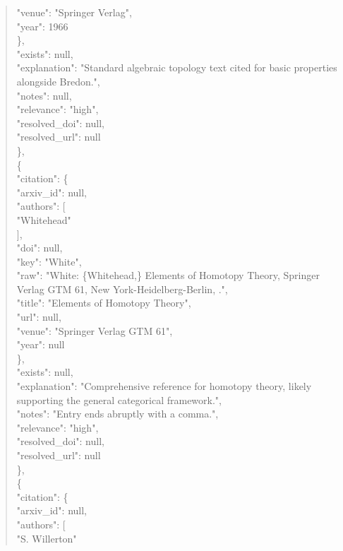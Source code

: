 \documentclass[11pt]{article}
\begin{document}
\begin{quote}
        "venue": "Springer Verlag",\\
        "year": 1966\\
      \},\\
      "exists": null,\\
      "explanation": "Standard algebraic topology text cited for basic properties alongside Bredon.",\\
      "notes": null,\\
      "relevance": "high",\\
      "resolved\_doi": null,\\
      "resolved\_url": null\\
    \},\\
    \{\\
      "citation": \{\\
        "arxiv\_id": null,\\
        "authors": [\\
          "Whitehead"\\
        ],\\
        "doi": null,\\
        "key": "White",\\
        "raw": "White: \{Whitehead,\} Elements of Homotopy Theory, Springer Verlag GTM 61, New York-Heidelberg-Berlin, .",\\
        "title": "Elements of Homotopy Theory",\\
        "url": null,\\
        "venue": "Springer Verlag GTM 61",\\
        "year": null\\
      \},\\
      "exists": null,\\
      "explanation": "Comprehensive reference for homotopy theory, likely supporting the general categorical framework.",\\
      "notes": "Entry ends abruptly with a comma.",\\
      "relevance": "high",\\
      "resolved\_doi": null,\\
      "resolved\_url": null\\
    \},\\
    \{\\
      "citation": \{\\
        "arxiv\_id": null,\\
        "authors": [\\
          "S. Willerton"\\

\end{quote}
\end{document}
